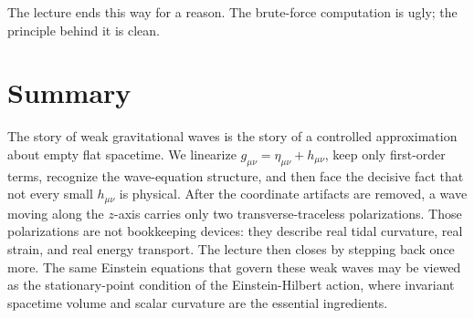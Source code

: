 The lecture ends this way for a reason. The brute-force computation is ugly; the principle behind it is clean.

\section{Summary}

The story of weak gravitational waves is the story of a controlled approximation about empty flat spacetime. We linearize \(g_{\mu\nu}=\eta_{\mu\nu}+h_{\mu\nu}\), keep only first-order terms, recognize the wave-equation structure, and then face the decisive fact that not every small \(h_{\mu\nu}\) is physical. After the coordinate artifacts are removed, a wave moving along the \(z\)-axis carries only two transverse-traceless polarizations. Those polarizations are not bookkeeping devices: they describe real tidal curvature, real strain, and real energy transport. The lecture then closes by stepping back once more. The same Einstein equations that govern these weak waves may be viewed as the stationary-point condition of the Einstein-Hilbert action, where invariant spacetime volume and scalar curvature are the essential ingredients.